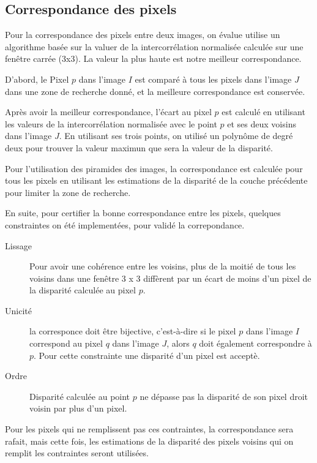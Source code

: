 \documentclass[a4paper,12pt]{article}
\begin{document}
\newpage
\subsection{Correspondance des pixels}

Pour la correspondance des pixels entre deux images, on évalue utilise
un algorithme basée sur la valuer de la intercorrélation normalisée
calculée sur une fenêtre carrée (3x3). La valeur la plus haute est
notre meilleur correspondance. 

D'abord, le Pixel $p$ dans l'image $I$ est comparé à tous les pixels
dans l'image $J$ dans une zone de recherche donné, et la meilleure
correspondance est conservée.  

Après avoir la meilleur correspondance, l'écart au pixel $p$ est
calculé en utilisant les valeurs de la intercorrélation normalisée
avec le point $p$ et ses deux voisins dans l'image $J$. En utilisant
ses trois points, on utilisé un polynôme de degré deux pour trouver la
valeur maximun que sera la valeur de la disparité. 

Pour l'utilisation des piramides des images, la correspondance est
calculée pour tous les pixels en utilisant les estimations de la
disparité de la couche précédente pour limiter la zone de recherche.  

En suite, pour certifier la bonne correspondance entre les pixels,
quelques constraintes on été implementées, pour validé la
correpondance.
\begin{description}

\item[Lissage] Pour avoir une cohérence entre les voisins, plus de la
  moitié de tous les voisins dans une fenêtre 3 x 3 diffèrent par un
  écart de moins d'un pixel de la disparité calculée au pixel $p$.  

\item[Unicité] la corresponce doit être bijective, c'est-à-dire si le
  pixel $p$ dans l'image $I$ correspond au pixel $q$ dans l'image $J$,
  alors $q$ doit également correspondre à $p$. Pour cette constrainte
  une disparité d'un pixel est acceptè.
\item[Ordre] Disparité calculée au point $p$ ne dépasse pas la
  disparité de son pixel droit voisin par plus d'un pixel.
\end{description}

Pour les pixels qui ne remplissent pas ces contraintes, la
correspondance sera rafait, mais cette fois, les estimations de la
disparité des pixels voisins qui on remplit les contraintes seront
utilisées. 
\end{document}
